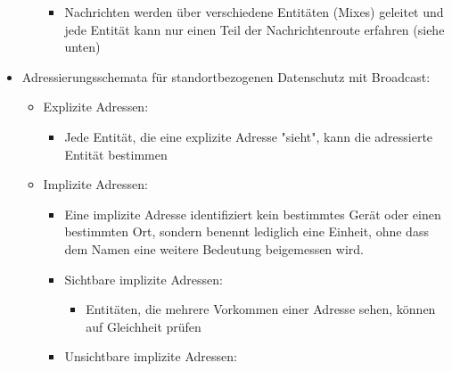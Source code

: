 \documentclass[a4paper]{article}
\begin{document}
\begin{multicols}{3}
\begin{itemize}
\begin{itemize}
                        \begin{itemize}
                            \item
                                  Nachrichten werden über verschiedene Entitäten (Mixes) geleitet
                                  und jede Entität kann nur einen Teil der Nachrichtenroute erfahren
                                  (siehe unten)
                        \end{itemize}
              \end{itemize}
        \item
              Adressierungsschemata für standortbezogenen Datenschutz mit Broadcast:

              \begin{itemize}
                  \item
                        Explizite Adressen:

                        \begin{itemize}
                            \item
                                  Jede Entität, die eine explizite Adresse "sieht", kann die
                                  adressierte Entität bestimmen
                        \end{itemize}
                  \item
                        Implizite Adressen:

                        \begin{itemize}
                            \item
                                  Eine implizite Adresse identifiziert kein bestimmtes Gerät oder
                                  einen bestimmten Ort, sondern benennt lediglich eine Einheit, ohne
                                  dass dem Namen eine weitere Bedeutung beigemessen wird.
                            \item
                                  Sichtbare implizite Adressen:

                                  \begin{itemize}
                                      \item
                                            Entitäten, die mehrere Vorkommen einer Adresse sehen, können auf
                                            Gleichheit prüfen
                                  \end{itemize}
                            \item
                                  Unsichtbare implizite Adressen:


\end{itemize}
\end{itemize}
\end{itemize}
\end{multicols}
\end{document}
